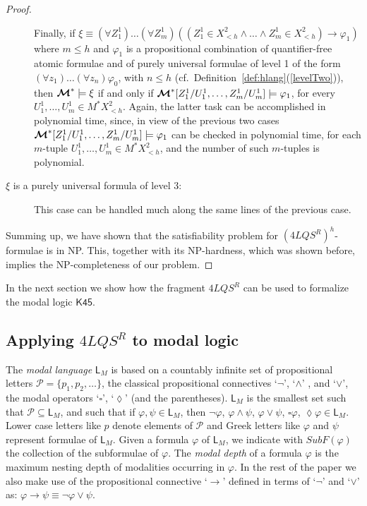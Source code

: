 \documentclass{fundam}
\renewcommand{\And}{\wedge}
\newcommand{\Or}{\vee}
\newcommand{\model}{\ensuremath{\mbox{\boldmath $\mathcal{M}$}}\xspace}
\newcommand{\SubF}{\mathit{SubF}}
\newcommand{\Kqc}{\mathsf{K45}}
\newcommand{\QLQSR}{\ensuremath{\mbox{$4\mathit{LQS}^{R}$}}\xspace}
\begin{document}
\begin{proof}
\begin{description}
Finally, if $\xi \equiv (\forall Z_1^1)\ldots (\forall Z_m^1)((Z_1^1
\in X_{< h}^2 \wedge \ldots \wedge Z_m^1 \in X_{< h}^2) \rightarrow
\varphi_1)$ where $m \leq h$ and $\varphi_1$ is a propositional
combination of quantifier-free atomic formulae and of purely universal formulae of level 1 of the form $(\forall z_1)\ldots(\forall
z_n)\varphi_0$, with $n \leq h$ (cf.\
Definition~\ref{def:hlang}(\ref{levelTwo})), then $\model^* \models
\xi$ if and only if $\model^*[Z_1^1/U_1^1,\ldots,Z_m^1/U_m^1] \models
\varphi_1$, for every $U_1^1, \ldots,U_m^1 \in M^*X_{< h}^2$.  Again,
the latter task can be accomplished in polynomial time, since, in view
of the previous two cases $\model^*[Z_1^1/U_1^1,\ldots,Z_m^1/U_m^1]
\models \varphi_1$ can be checked in polynomial time, for each
$m$-tuple $U_1^1, \ldots,U_m^1 \in M^*X_{< h}^2$, and the number of
such $m$-tuples is polynomial.



\item [$\xi$ is a purely universal formula of level 3:]
This case can be handled much along the same lines of the previous
case.
\end{description}
Summing up, we have shown that the satisfiability problem for
$(\QLQSR)^h$-formulae is in \textsf{NP}.  This, together with its
\textsf{NP}-hardness, which was shown before, implies the
\textsf{NP}-completeness of our problem.
\end{proof}

In the next section we show how the fragment $\QLQSR$ can be used
to formalize the modal logic $\Kqc$.

\subsection{Applying $\QLQSR$ to modal logic}
The \emph{modal language} $\mathsf{L}_{M}$ is based on a countably
infinite set of propositional letters ${\mathcal P} =
\{p_1,p_2,\ldots\}$, the classical propositional connectives `$\neg$',
`$\And$' , and `$\Or$', the modal operators `$\square$', `$\lozenge$'
(and the parentheses).  $\mathsf{L}_{M}$ is the smallest set such that
${\mathcal P} \subseteq \mathsf{L}_{M}$, and such that if
$\varphi,\psi \in \mathsf{L}_{M}$, then $\neg \varphi$, $\varphi \And
\psi$, $\varphi \Or \psi$, $\square \varphi$, $\lozenge\varphi\in
\mathsf{L}_{M}$.  Lower case letters like $p$ denote elements of
${\mathcal P}$ and Greek letters like $\varphi$ and $\psi$ represent
formulae of $\mathsf{L}_{M}$.  Given a formula $\varphi$ of
$\mathsf{L}_{M}$, we indicate with $\SubF(\varphi)$ the collection of
the subformulae of $\varphi$.  The \emph{modal depth} of a formula
$\varphi$ is the maximum nesting depth of modalities occurring in
$\varphi$. In the rest of the paper we also make use of the propositional connective `$\rightarrow$' defined in terms of
`$\neg$' and `$\Or$' as: $\varphi \rightarrow \psi \equiv \neg \varphi \Or \psi$.
\end{document}
